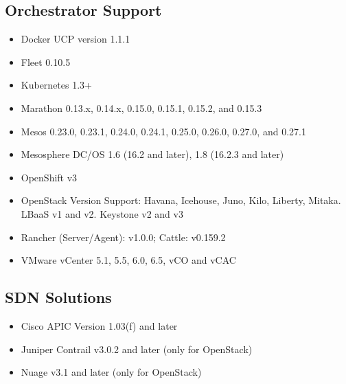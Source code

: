 \documentclass[letterpaper,10pt,english]{sphinxmanual}
\begin{document}
\subsection{Orchestrator Support}
\label{\detokenize{getting_started/requirements_ecosystem:orchestrator-support}}\begin{itemize}
\item {} 
Docker UCP version 1.1.1

\item {} 
Fleet 0.10.5

\item {} 
Kubernetes 1.3+

\item {} 
Marathon 0.13.x, 0.14.x, 0.15.0, 0.15.1, 0.15.2, and 0.15.3

\item {} 
Mesos 0.23.0, 0.23.1, 0.24.0, 0.24.1, 0.25.0, 0.26.0, 0.27.0, and 0.27.1

\item {} 
Mesosphere DC/OS 1.6 (16.2 and later), 1.8 (16.2.3 and later)

\item {} 
OpenShift v3

\item {} 
OpenStack Version Support: Havana, Icehouse, Juno, Kilo, Liberty, Mitaka. LBaaS v1 and v2. Keystone v2 and v3

\item {} 
Rancher (Server/Agent): v1.0.0; Cattle: v0.159.2

\item {} 
VMware vCenter 5.1, 5.5, 6.0, 6.5, vCO and vCAC

\end{itemize}


\subsection{SDN Solutions}
\label{\detokenize{getting_started/requirements_ecosystem:sdn-solutions}}\begin{itemize}
\item {} 
Cisco APIC Version 1.03(f) and later

\item {} 
Juniper Contrail v3.0.2 and later (only for OpenStack)

\item {} 
Nuage v3.1 and later (only for OpenStack)

\end{itemize}
\end{document}
